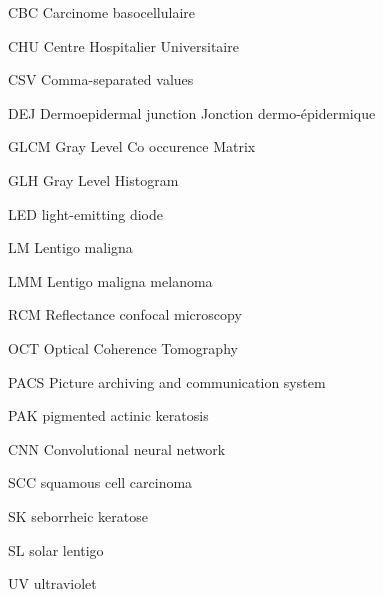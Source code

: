 
            {CBC}
            {Carcinome basocellulaire}
            
            {CHU}
            {Centre Hospitalier Universitaire}
            
            {CSV}
            {Comma-separated values}
            
            {DEJ}
            {Dermoepidermal junction}
            Jonction dermo-épidermique
            
            {GLCM}
            {Gray Level Co occurence Matrix}
            
            {GLH}
            {Gray Level Histogram}
            
            {LED}
            {light-emitting diode}
            
            {LM}
            {Lentigo maligna}
            
            {LMM}
            {Lentigo maligna melanoma}
            
            {RCM}
            {Reflectance confocal microscopy}

            {OCT}
            {Optical Coherence Tomography}
            
            {PACS}
            {Picture archiving and communication system}
         
            {PAK}
            {pigmented actinic keratosis}
            
            {CNN}
            {Convolutional neural network}
            
            {SCC}
            {squamous cell carcinoma}
            
            {SK}
            {seborrheic keratose}
            
            {SL}
            {solar lentigo}
            
            {UV}
            {ultraviolet}
